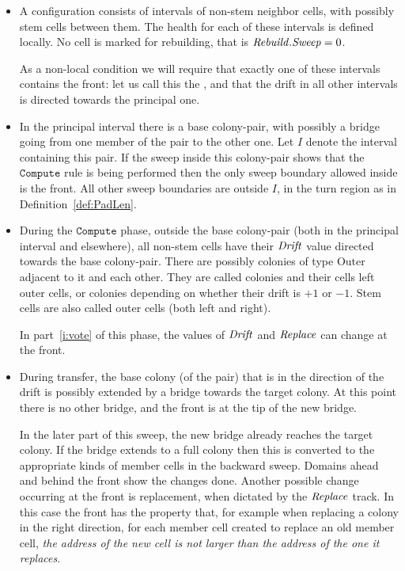 \documentclass[11pt]{memoir}
\theoremstyle{definition} %
\newcommand{\fld}[1]{\ensuremath{\textit{#1\/}}}
\newcommand{\rul}[1]{\ensuremath{\texttt{#1}}}
\newcommand{\Drift}{\fld{Drift}}
\newcommand{\Rebuild}{\fld{Rebuild}} %
\newcommand{\Replace}{\fld{Replace}}
\newcommand{\Sweep}{\fld{Sweep}} %
\newcommand{\Outer}{\mathrm{Outer}}
\newcommand{\Compute}{\rul{Compute}}
\begin{document}
\begin{itemize}
\item   A configuration consists of intervals of non-stem neighbor cells,
  with possibly stem cells between them.
  The health for each of these intervals is defined locally.
  No cell is marked for rebuilding, that is \( \Rebuild.\Sweep=0 \).

  As a non-local condition we will require that exactly one of these intervals contains
  the front: let us call this the ,
  and that the drift in all other intervals is directed towards the principal one.
 
\item  In the principal interval
  there is a base colony-pair, with possibly a bridge going from one member of the pair
  to the other one.
  Let \( I \) denote the interval containing this pair.
  If the sweep inside this colony-pair shows that the \( \Compute \) rule is being performed then
  the only sweep boundary allowed inside is the front.
  All other sweep boundaries are outside \( I \), in the turn region as in Definition~\ref{def:PadLen}.

\item During the \( \Compute \) phase,
  outside the base colony-pair (both in the principal interval and elsewhere),
  all non-stem cells have their \( \Drift \) value directed towards the base colony-pair.
  There are possibly colonies of type \( \Outer \) adjacent to it and each other.
  They are called  colonies and their cells left outer cells, or
   colonies depending on whether their drift is \( +1 \) or \( -1 \).
  Stem cells are also called outer cells (both left and right).

  In part~\ref{i:vote} of this phase, the values of \( \Drift \) and \( \Replace \) can change at the front.
  
\item  During transfer, the base colony (of the pair)
  that is in the direction of the drift is possibly extended by a bridge towards the target colony.
  At this point there is no other bridge, and the front is at the tip of the new bridge.
  
  In the later part of this sweep, the new bridge already reaches the target colony.
  If the bridge extends to a full colony then this is converted to the appropriate kinds of member
  cells in the backward sweep.
  Domains ahead and behind the front show the changes done.
  Another possible change occurring at the front is replacement, when dictated by the \( \Replace \) track.
  In this case the front has the property that, for example when replacing a colony in the right direction,
  for each member cell created to replace an old member cell, \emph{the address of the new cell is not
  larger than the address of the one it replaces}.
  
\end{itemize}
\end{document}
